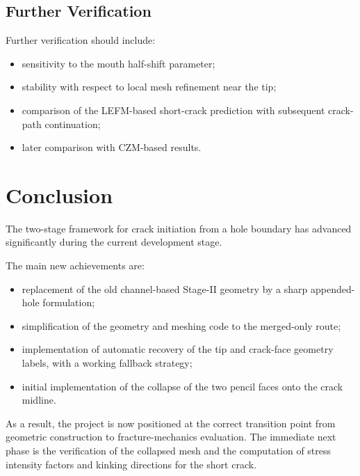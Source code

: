 \documentclass[11pt]{article}
\begin{document}
	\subsection{Further Verification}
	
	Further verification should include:
	\begin{itemize}
		\item sensitivity to the mouth half-shift parameter;
		\item stability with respect to local mesh refinement near the tip;
		\item comparison of the LEFM-based short-crack prediction with subsequent crack-path continuation;
		\item later comparison with CZM-based results.
	\end{itemize}
	
	\section{Conclusion}
	
	The two-stage framework for crack initiation from a hole boundary has advanced significantly during the current development stage.
	
	The main new achievements are:
	\begin{itemize}
		\item replacement of the old channel-based Stage-II geometry by a sharp appended-hole formulation;
		\item simplification of the geometry and meshing code to the merged-only route;
		\item implementation of automatic recovery of the tip and crack-face geometry labels, with a working fallback strategy;
		\item initial implementation of the collapse of the two pencil faces onto the crack midline.
	\end{itemize}
	
	As a result, the project is now positioned at the correct transition point from geometric construction to fracture-mechanics evaluation. The immediate next phase is the verification of the collapsed mesh and the computation of stress intensity factors and kinking directions for the short crack.
	
\end{document}
